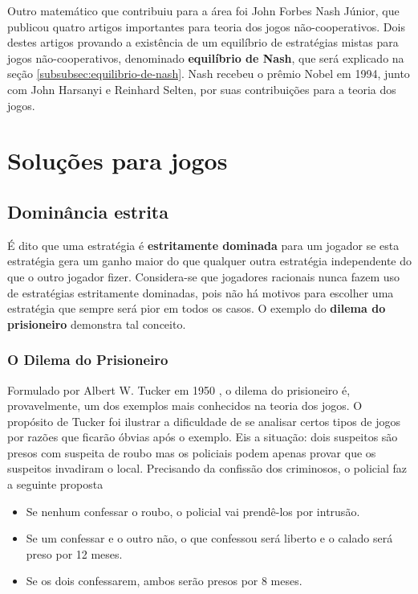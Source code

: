 Outro matemático que contribuiu para a área foi John Forbes Nash Júnior, que publicou quatro artigos importantes para teoria dos jogos não-cooperativos. Dois destes artigos \cite{nash_1950} \cite{nash_1951} provando a existência de um equilíbrio de estratégias mistas para jogos não-cooperativos, denominado \textbf{equilíbrio de Nash}, que será explicado na seção \ref{subsubsec:equilibrio-de-nash}. Nash recebeu o prêmio Nobel em 1994, junto com John Harsanyi e Reinhard Selten, por suas contribuições para a teoria dos jogos.

\section{Soluções para jogos}
\subsection{Dominância estrita}

É dito que uma estratégia é {\bfseries estritamente dominada} para um jogador se esta estratégia gera um ganho maior do que qualquer outra estratégia independente do que o outro jogador fizer. Considera-se que jogadores racionais nunca fazem uso de estratégias estritamente dominadas, pois não há motivos para escolher uma estratégia que sempre será pior em todos os casos. O exemplo do {\bfseries dilema do prisioneiro} demonstra tal conceito.

\subsubsection{O Dilema do Prisioneiro}
Formulado por Albert W. Tucker em 1950 \cite{sartini_IIbienaldasbm}, o dilema do prisioneiro é, provavelmente, um dos exemplos mais conhecidos na teoria dos jogos. O propósito de Tucker foi ilustrar a dificuldade de se analisar certos tipos de jogos por razões que ficarão óbvias após o exemplo. Eis a situação: dois suspeitos são presos com suspeita de roubo mas os policiais podem apenas provar que os suspeitos invadiram o local. Precisando da confissão dos criminosos, o policial faz a seguinte proposta
\begin{itemize}
	\item Se nenhum confessar o roubo, o policial vai prendê-los por intrusão.
	\item Se um confessar e o outro não, o que confessou será liberto e o calado será preso por 12 meses.
	\item Se os dois confessarem, ambos serão presos por 8 meses.
\end{itemize}

